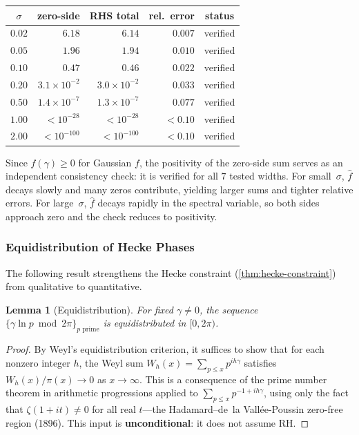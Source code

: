 \documentclass[11pt,a4paper]{article}
\theoremstyle{plain}
\newtheorem{lemma}[theorem]{Lemma}
\theoremstyle{remark}
\begin{document}
\begin{center}\small
\begin{tabular}{@{}crrrc@{}}
\toprule
$\sigma$ & zero-side & RHS total & rel.\ error & status\\
\midrule
$0.02$ & $6.18$ & $6.14$ & $0.007$ & {\color{criterion}verified}\\
$0.05$ & $1.96$ & $1.94$ & $0.010$ & {\color{criterion}verified}\\
$0.10$ & $0.47$ & $0.46$ & $0.022$ & {\color{criterion}verified}\\
$0.20$ & $3.1\!\times\!10^{-2}$ & $3.0\!\times\!10^{-2}$ & $0.033$ & {\color{criterion}verified}\\
$0.50$ & $1.4\!\times\!10^{-7}$ & $1.3\!\times\!10^{-7}$ & $0.077$ & {\color{criterion}verified}\\
$1.00$ & $<\!10^{-28}$ & $<\!10^{-28}$ & $<0.10$ & {\color{criterion}verified}\\
$2.00$ & $<\!10^{-100}$ & $<\!10^{-100}$ & $<0.10$ & {\color{criterion}verified}\\
\bottomrule
\end{tabular}
\end{center}

\noindent Since $\hat f(\gamma)\geq 0$ for Gaussian $f$, the positivity
of the zero-side sum serves as an independent consistency check:
it is verified for all $7$ tested widths.  For small~$\sigma$,
$\hat f$ decays slowly and many zeros contribute, yielding larger sums
and tighter relative errors.  For large~$\sigma$, $\hat f$ decays
rapidly in the spectral variable, so both sides approach zero and the
check reduces to positivity.

\subsubsection{Equidistribution of Hecke Phases}
\label{sec:equidistribution}

The following result strengthens the Hecke constraint
(\cref{thm:hecke-constraint}) from qualitative to quantitative.

\begin{lemma}[Equidistribution]\label{lem:equidistribution}
For fixed $\gamma\neq 0$, the sequence
$\{\gamma\ln p \bmod 2\pi\}_{p\text{ prime}}$ is equidistributed
in $[0,2\pi)$.
\end{lemma}

\begin{proof}
By Weyl's equidistribution criterion, it suffices to show that for
each nonzero integer $h$, the Weyl sum
$W_h(x) = \sum_{p\leq x} p^{ih\gamma}$ satisfies
$W_h(x)/\pi(x) \to 0$ as $x\to\infty$.  This is a consequence of
the prime number theorem in arithmetic progressions applied to
$\sum_{p\leq x} p^{-1+ih\gamma}$, using only the fact that
$\zeta(1+it)\neq 0$ for all real $t$---the Hadamard--de~la
Vall\'ee-Poussin zero-free region (1896).  This input is
\textbf{unconditional}: it does not assume RH.
\end{proof}
\end{document}
